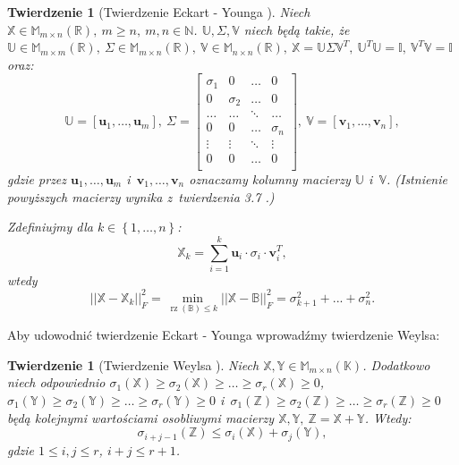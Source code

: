 \documentclass[12pt,a4paper]{report}
\newtheorem{tw}[df]{Twierdzenie}
\newcommand{\set}[1]{\left\lbrace {#1} \right\rbrace}
\newcommand{\setR}{\mathbb{R}}
\newcommand{\setK}{\mathbb{K}}
\newcommand{\setN}{\mathbb{N}}
\newcommand{\rz}[1]{\operatorname{rz}\left({#1} \right)}
\begin{document}
\begin{tw}[Twierdzenie Eckart - Younga {\citep{tsvdalra, ulafiir}}]%
Niech $\mathbb{X} \in \mathbb{M}_{m \times n}(\setR),\: m \geq n, \:  m,n \in \setN$. $\mathbb{U}, \Sigma, \mathbb{V}$ niech będą takie, że $\mathbb{U} \in \mathbb{M}_{m \times m}(\setR), \: \Sigma \in \mathbb{M}_{m \times n}(\setR), \: \mathbb{V} \in \mathbb{M}_{n \times n}(\setR), \: \mathbb{X}=\mathbb{U}\Sigma \mathbb{V}^T, \: \mathbb{U}^T \mathbb{U} = \mathbb{I}, \: \mathbb{V}^T \mathbb{V} =\mathbb{I}$ oraz:
$$
\mathbb{U} = [\mathbf{u}_1, \ldots, \mathbf{u}_m], \: \Sigma = \left[
        \begin{array}{cccc}
         \sigma_{1} & 0 & \ldots & 0 \\
         0 & \sigma_{2} & \ldots & 0 \\
         \ldots & \ldots& \ddots & \ldots \\
         0 & 0 & \ldots & \sigma_{n} \\
         \vdots & \vdots & \ddots & \vdots \\
         0 & 0 & \ldots & 0 \\
         \end{array}
      \right], \: \mathbb{V} = [\mathbf{v}_1, \ldots, \mathbf{v}_n],
$$
gdzie przez $\mathbf{u}_1, \ldots, \mathbf{u}_m$ i~$\mathbf{v}_1, \ldots, \mathbf{v}_n$ oznaczamy kolumny macierzy $\mathbb{U}$ i~$\mathbb{V}$. (Istnienie powyższych macierzy wynika z~twierdzenia 3.7 .) 

Zdefiniujmy dla $k \in \set{1, \ldots, n}$:
$$
\mathbb{X}_k = \sum_{i=1}^k \mathbf{u}_i\cdot \sigma_{i} \cdot \mathbf{v}_i^T,
$$
wtedy
$$
||\mathbb{X} - \mathbb{X}_k||_F^2 = \min \limits_{\rz{\mathbb{B}} \leqslant k } ||\mathbb{X} - \mathbb{B}||_F^2 = \sigma_{k+1}^2 + ... + \sigma_{n}^2.
$$
\end{tw}

Aby udowodnić twierdzenie Eckart - Younga wprowadźmy twierdzenie Weylsa:

\begin{tw}[Twierdzenie Weylsa {\citep{wayls}}]
Niech $\mathbb{X}, \mathbb{Y} \in \mathbb{M}_{m \times n}(\setK)$.
Dodatkowo niech odpowiednio $\sigma_1(\mathbb{X}) \geq \sigma_2(\mathbb{X})\geq \ldots \geq \sigma_r(\mathbb{X})\geq 0$, $\sigma_1(\mathbb{Y}) \geq \sigma_2(\mathbb{Y})\geq \ldots \geq \sigma_r(\mathbb{Y})\geq 0$ i~$\sigma_1(\mathbb{Z}) \geq \sigma_2(\mathbb{Z})\geq \ldots \geq \sigma_r(\mathbb{Z})\geq 0$ będą kolejnymi wartościami osobliwymi macierzy $\mathbb{X}, \mathbb{Y}, \: \mathbb{Z}=\mathbb{X} + \mathbb{Y}$. Wtedy:
$$
\sigma_{i+j-1}(\mathbb{Z}) \leq \sigma_i(\mathbb{X}) + \sigma_j(\mathbb{Y}),
$$
gdzie $1 \leq i,j \leq r$, $i+j\leq r+1$.
\end{tw}
\end{document}
